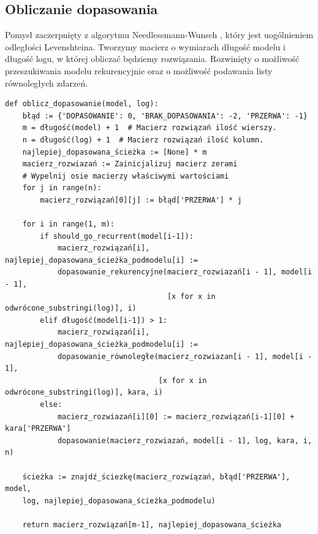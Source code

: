 \subsection{Obliczanie dopasowania}
Pomysł zaczerpnięty z algorytmu Needlessmann-Wunsch \cite{ea252fd3937a4a309a5e07e61e5531a7}, który jest uogólnieniem odległości Levenshteina. Tworzymy macierz o wymiarach długość modelu i długość logu, w której obliczać będziemy rozwiązania. Rozwinięty o możliwość przeszukiwania modelu rekurencyjnie oraz o możliwość podawania listy równoległych zdarzeń. 
\lstset{caption=Obliczanie dopasowania, captionpos=b}
\lstset{label=src:alignment_calculation, frame=single}
\begin{lstlisting}[escapeinside=``]
def oblicz_dopasowanie(model, log):
    błąd := {'DOPASOWANIE': 0, 'BRAK_DOPASOWANIA': -2, 'PRZERWA': -1}
    m = długość(model) + 1  # Macierz rozwiązań ilość wierszy.
    n = długość(log) + 1  # Macierz rozwiązań ilość kolumn.
    najlepiej_dopasowana_ścieżka := [None] * m
    macierz_rozwiazań := Zainicjalizuj macierz zerami
    # Wypelnij osie macierzy właściwymi wartościami
    for j in range(n):
        macierz_rozwiązań[0][j] := błąd['PRZERWA'] * j

    for i in range(1, m):
        if should_go_recurrent(model[i-1]):
            macierz_rozwiązań[i], najlepiej_dopasowana_ścieżka_podmodelu[i] := 
            dopasowanie_rekurencyjne(macierz_rozwiazań[i - 1], model[i - 1],
                                     [x for x in odwrócone_substringi(log)], i)
        elif długość(model[i-1]) > 1:
            macierz_rozwiązań[i], najlepiej_dopasowana_ścieżka_podmodelu[i] := 
            dopasowanie_równoległe(macierz_rozwiazan[i - 1], model[i - 1],
                                   [x for x in odwrócone_substringi(log)], kara, i)
        else:
            macierz_rozwiazań[i][0] := macierz_rozwiązań[i-1][0] + kara['PRZERWA']
            dopasowanie(macierz_rozwiazań, model[i - 1], log, kara, i, n)

    ścieżka := znajdź_ściezkę(macierz_rozwiązań, błąd['PRZERWA'], model, 
    log, najlepiej_dopasowana_ścieżka_podmodelu)

    return macierz_rozwiązań[m-1], najlepiej_dopasowana_ścieżka
\end{lstlisting}

